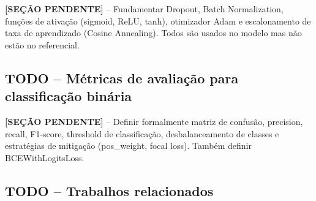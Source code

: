 \textbf{[SEÇÃO PENDENTE]} -- Fundamentar Dropout, Batch Normalization, funções de ativação (sigmoid, ReLU, tanh), otimizador Adam e escalonamento de taxa de aprendizado (Cosine Annealing). Todos são usados no modelo mas não estão no referencial.


\subsection{TODO -- Métricas de avaliação para classificação binária}
\label{Sec:todo_metricas}

%
%
%
%
%
%
%

\textbf{[SEÇÃO PENDENTE]} -- Definir formalmente matriz de confusão, precision, recall, F1-score, threshold de classificação, desbalanceamento de classes e estratégias de mitigação (pos\_weight, focal loss). Também definir BCEWithLogitsLoss.


\subsection{TODO -- Trabalhos relacionados}
\label{Sec:todo_trabalhos_relacionados}

